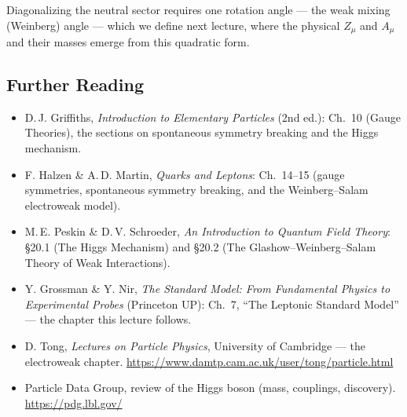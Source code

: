 Diagonalizing the neutral sector requires one rotation angle --- the weak mixing (Weinberg) angle --- which we define next lecture, where the physical $Z_\mu$ and $A_\mu$ and their masses emerge from this quadratic form.


\begin{furtherreading}
\subsection*{Further Reading}

\begin{itemize}
  \item D.\,J. Griffiths, \textit{Introduction to Elementary Particles} (2nd ed.): Ch.~10 (Gauge Theories), the sections on spontaneous symmetry breaking and the Higgs mechanism.
  \item F. Halzen \& A.\,D. Martin, \textit{Quarks and Leptons}: Ch.~14--15 (gauge symmetries, spontaneous symmetry breaking, and the Weinberg--Salam electroweak model).
  \item M.\,E. Peskin \& D.\,V. Schroeder, \textit{An Introduction to Quantum Field Theory}: \S20.1 (The Higgs Mechanism) and \S20.2 (The Glashow--Weinberg--Salam Theory of Weak Interactions).
  \item Y. Grossman \& Y. Nir, \textit{The Standard Model: From Fundamental Physics to Experimental Probes} (Princeton UP): Ch.~7, ``The Leptonic Standard Model'' --- the chapter this lecture follows.
  \item D. Tong, \textit{Lectures on Particle Physics}, University of Cambridge --- the electroweak chapter. \url{https://www.damtp.cam.ac.uk/user/tong/particle.html}
  \item Particle Data Group, review of the Higgs boson (mass, couplings, discovery). \url{https://pdg.lbl.gov/}
\end{itemize}
\end{furtherreading}

